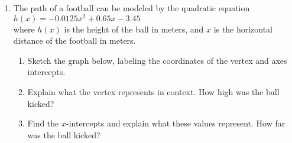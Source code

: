 \documentclass[12pt, twoside]{article}
\begin{document}
\begin{enumerate}
\newpage
\item The path of a football can be modeled by the quadratic equation\\[0.25cm]
$h(x)=-0.0125x^2+0.65x-3.45$ \\[0.25cm]
where $h(x)$ is the height of the ball in meters, and $x$ is the horizontal distance of the football in meters.
    \begin{enumerate}
        \item Sketch the graph below, labeling the coordinates of the vertex and axes intercepts.
        \item Explain what the vertex represents in context. How high was the ball kicked?\vspace{2cm}
        \item Find the $x$-intercepts and explain what these values represent. How far was the ball kicked?\vspace{2cm}
    \end{enumerate}
    \begin{center}
    \end{center}

\end{enumerate}
\end{document}
